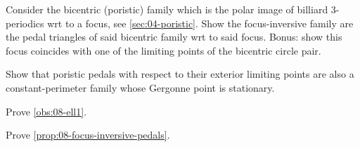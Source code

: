 \begin{exercise}
Consider the bicentric (poristic) family which is the polar image of billiard 3-periodics wrt to a focus, see \cref{sec:04-poristic}. Show the focus-inversive family are the pedal triangles of said bicentric family wrt to said focus. Bonus: show this focus coincides with one of the limiting points of the bicentric circle pair.
\label{exe:08-limiting}
\end{exercise}

\begin{exercise}
Show that poristic pedals with respect to their exterior limiting points are also a constant-perimeter family whose Gergonne point is stationary.
\end{exercise}

\begin{exercise}
Prove \cref{obs:08-ell1}.
\end{exercise}

\begin{exercise}
Prove \cref{prop:08-focus-inversive-pedals}.
\end{exercise}

